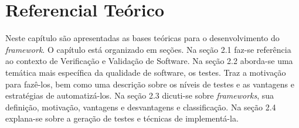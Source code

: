 \chapter[Referencial Teórico]{Referencial Teórico}
Neste capítulo são apresentadas as bases teóricas para o desenvolvimento do \textit{framework}. O capítulo está organizado em seções. Na seção 2.1 faz-se referência ao contexto de Verificação e Validação de Software. Na seção 2.2 aborda-se uma temática mais específica da qualidade de software, os testes. Traz a motivação para fazê-los, bem como uma descrição sobre os níveis de testes e as vantagens e estratégias de automatizá-los. Na seção 2.3 dicuti-se sobre \textit{frameworks}, sua definição, motivação, vantagens e desvantagens e classificação. Na seção 2.4 explana-se sobre a geração de testes e técnicas de implementá-la.

